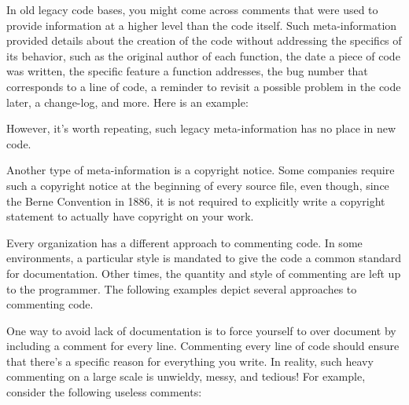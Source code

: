 In old legacy code bases, you might come across comments that were used to provide information at a higher level than the code itself. Such meta-information provided details about the creation of the code without addressing the specifics of its behavior, such as the original author of each function, the date a piece of code was written, the specific feature a function addresses, the bug number that corresponds to a line of code, a reminder to revisit a possible problem in the code later, a change-log, and more. Here is an example:


However, it’s worth repeating, such legacy meta-information has no place in new code.


Another type of meta-information is a copyright notice. Some companies require such a copyright notice at the beginning of every source file, even though, since the Berne Convention in 1886, it is not required to explicitly write a copyright statement to actually have copyright on your work.


Every organization has a different approach to commenting code. In some environments, a particular style is mandated to give the code a common standard for documentation. Other times, the quantity and style of commenting are left up to the programmer. The following examples depict several approaches to commenting code.


One way to avoid lack of documentation is to force yourself to over document by including a comment for every line. Commenting every line of code should ensure that there’s a specific reason for everything you write. In reality, such heavy commenting on a large scale is unwieldy, messy, and tedious! For example, consider the following useless comments:

